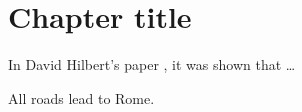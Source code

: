 
\chapter{Chapter title}

In David Hilbert's paper \cite{Hilbert:1901aa}, it was shown that \dots

\begin{theorem}
All roads lead to Rome.
\end{theorem}